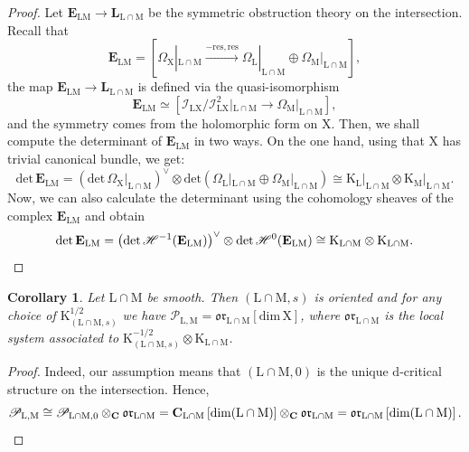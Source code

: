 \documentclass{article}
\theoremstyle{plain}
\newtheorem{corollary}[theorem]{Corollary}
\theoremstyle{definition}
\theoremstyle{remark}
\newcommand{\mr}{\mathrm}
\newcommand{\C}{\mathbf C}
\newcommand{\3}{\vspace{3mm}}
\newcommand{\2}{\vspace{2mm}}
\newcommand{\1}{\vspace{1mm}}
\begin{document}
 \begin{proof}
  Let $\mathbf{E}_{\mr{LM}}\to \mathbf{L}_\mr{L\cap M}$ be the symmetric obstruction theory on the intersection. Recall that $$\mathbf{E}_{\mr{LM}} = \left[\Omega_\mr{X}|_\mr{L\cap M} \xrightarrow{\mr{-res,res}} \Omega_\mr{L}|_\mr{L\cap M}\oplus\Omega_\mr{M}|_\mr{L\cap M}\right],$$ the map $\mathbf{E}_{\mr{LM}}\to \mathbf{L}_\mr{L\cap M}$ is defined via the quasi-isomorphism $$\mathbf{E}_{\mr{LM}} \simeq \left[\mathscr{I}_\mr{LX}/\mathscr{I}_\mr{LX}^2|_\mr{L\cap M} \to \Omega_\mr{M}|_\mr{L\cap M}\right],$$ and the symmetry comes from the holomorphic form on $\mr{X}$. Then, we shall compute the determinant of $\mathbf{E}_{\mr{LM}}$ in two ways. On the one hand, using that $\mr{X}$ has trivial canonical bundle, we get: $$\mr{det}\,\mathbf{E}_{\mr{LM}} = (\mr{det}\, \Omega_\mr{X}|_\mr{L\cap M})^\vee\otimes\mr{det}(\Omega_\mr{L}|_\mr{L\cap M}\oplus \Omega_\mr{M}|_\mr{L\cap M}) \cong \left.\mr{K}_\mr{L}\right|_{\mr{L}\cap\mr{M}}\otimes \left.\mr{K}_\mr{M}\right|_{\mr{L}\cap\mr{M}}.$$ Now, we can also calculate the determinant using the cohomology sheaves of the complex $\mathbf{E}_{\mr{LM}}$ and obtain \[\mr{det}\,\mathbf{E}_{\mr{LM}} = \big(\mr{det}\,\mathscr{H}^{-1}(\mathbf{E}_{\mr{LM}})\big)^\vee\otimes\mr{det}\,\mathscr{H}^0(\mathbf{E}_{\mr{LM}}) \cong \mr{K}_{\mr{L}\cap\mr{M}}\otimes \mr{K}_{\mr{L}\cap\mr{M}}.\qedhere\]
 \end{proof}
\begin{corollary}
 Let $\mr{L}\cap \mr{M}$ be smooth. Then $(\mr{L}\cap \mr{M},s)$ is oriented and for any choice of $\mr{K}_{(\mr{L}\cap \mr{M},s)}^{1/2}$ we have $\mathscr{P}_{\mr{L,M}} = \mathfrak{or}_{\mr{L\cap M}}[\mr{dim}\,\mr{X}]$, where $\mathfrak{or}_{\mr{L\cap M}}$ is the local system associated to $\mr{K}_{(\mr{L}\cap \mr{M},s)}^{-1/2} \otimes \mr{K}_{\mr{L}\cap \mr{M}}$.
\end{corollary}
\begin{proof}
 Indeed, our assumption means that $(\mr{L}\cap\mr{M},0)$ is the unique $\mr{d}$-critical structure on the intersection. Hence, \[\mathscr{P}_{\mr{L,M}} \cong \mathscr{P}_{\mr{L\cap M},0}\otimes_{\C}\mathfrak{or}_{\mr{L\cap M}} = \C_\mr{L\cap M}\left[\mr{dim}(\mr{L}\cap\mr{M})\right]\otimes_\C  \mathfrak{or}_{\mr{L\cap M}}=\mathfrak{or}_{\mr{L\cap M}}\left[\mr{dim}(\mr{L}\cap\mr{M})\right].\qedhere \]
\end{proof}
\end{document}
